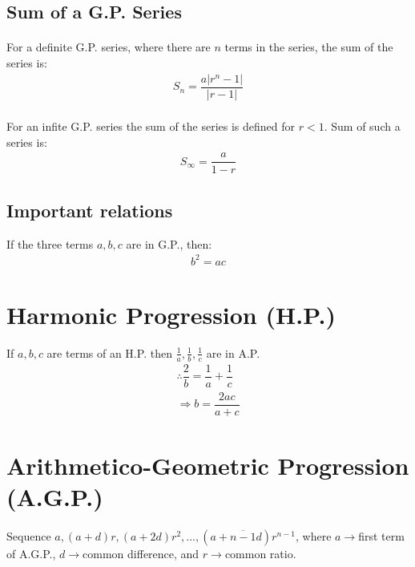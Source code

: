 \documentclass[openany, oneside]{book}
\begin{document}
\subsection{Sum of a G.P.  Series}
\paragraph{}For a definite G.P. series, where there are $n$ terms in the series, the sum of the series is:
\begin{align}
S_n=\dfrac{a\lvert r^n-1 \rvert}{\lvert r-1 \rvert}
\end{align}

\paragraph{}For an infite G.P. series the sum of the series is defined for $r<1$. Sum of such a series is:
\begin{align}
S_\infty=\dfrac{a}{1-r}
\end{align}

\subsection{Important relations}
If the three terms $a,b,c$ are in G.P., then:
\begin{align}
b^2=ac
\end{align}
\section{Harmonic Progression (H.P.)}
If $a,b,c$ are terms of an H.P. then $\frac{1}{a},\frac{1}{b},\frac{1}{c}$ are in A.P.
\begin{align}
\therefore \dfrac{2}{b}=\dfrac{1}{a}+\dfrac{1}{c}\\
\Rightarrow b=\dfrac{2ac}{a+c}
\end{align}

\section{\large{Arithmetico-Geometric Progression (A.G.P.)}}
\paragraph{}Sequence $a, (a+d)r, (a+2d)r^2,...,(a+\overline{n-1}d)r^{n-1}$, where $a\rightarrow$first term of A.G.P., $d\rightarrow$common difference, and $r\rightarrow$common ratio.
\end{document}
